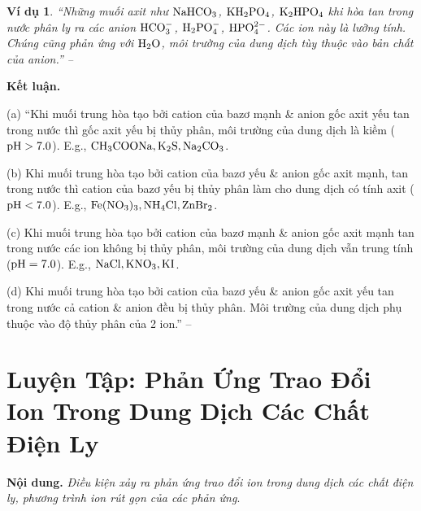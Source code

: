\documentclass[oneside]{book}
\numberwithin{equation}{section}
\newtheorem{vidu}{Ví dụ}[section]
\begin{document}
\begin{vidu}
	``Những muối axit như $\rm NaHCO_3$, $\rm KH_2PO_4$, $\rm K_2HPO_4$ khi hòa tan trong nước phân ly ra các anion $\rm HCO_3^-$, $\rm H_2PO_4^-$, $\rm HPO_4^{2-}$. Các ion này là lưỡng tính. Chúng cũng phản ứng với $\rm H_2O$, môi trường của dung dịch tùy thuộc vào bản chất của anion.'' -- \cite[p. 28]{SGK_Hoa_Hoc_11_nang_cao}
\end{vidu}
\noindent\textbf{Kết luận.}
\begin{enumerate*}
	\item[(a)] ``Khi muối trung hòa tạo bởi cation của bazơ mạnh \& anion gốc axit yếu tan trong nước thì gốc axit yếu bị thủy phân, môi trường của dung dịch là kiềm ($\rm pH > 7.0$). E.g., $\rm CH_3COONa,K_2S,Na_2CO_3$.
	\item[(b)] Khi muối trung hòa tạo bởi cation của bazơ yếu \& anion gốc axit mạnh, tan trong nước thì cation của bazơ yếu bị thủy phân làm cho dung dịch có tính axit ($\rm pH < 7.0$). E.g., $\rm Fe(NO_3)_3,NH_4Cl,ZnBr_2$.
	\item[(c)] Khi muối trung hòa tạo bởi cation của bazơ mạnh \& anion gốc axit mạnh tan trong nước các ion không bị thủy phân, môi trường của dung dịch vẫn trung tính ($\rm pH = 7.0$). E.g., $\rm NaCl,KNO_3,KI$.
	\item[(d)] Khi muối trung hòa tạo bởi cation của bazơ yếu \& anion gốc axit yếu tan trong nước cả cation \& anion đều bị thủy phân. Môi trường của dung dịch phụ thuộc vào độ thủy phân của 2 ion.'' -- \cite[p. 28]{SGK_Hoa_Hoc_11_nang_cao}
\end{enumerate*}


\section{Luyện Tập: Phản Ứng Trao Đổi Ion Trong Dung Dịch Các Chất Điện Ly}
\textbf{Nội dung.} \textit{Điều kiện xảy ra phản ứng trao đổi ion trong dung dịch các chất điện ly, phương trình ion rút gọn của các phản ứng}.
\end{document}
